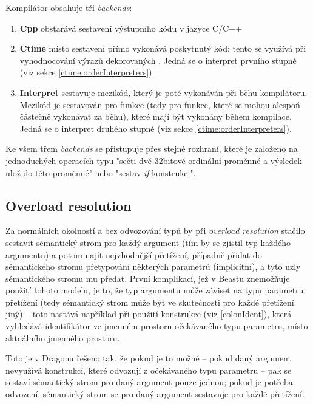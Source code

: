 Kompilátor obsahuje tři \textit{backends}:
\begin{enumerate}
	\item \textbf{Cpp} obstarává sestavení výstupního kódu v jazyce C/C++
	\item \textbf{Ctime} místo sestavení přímo vykonává poskytnutý kód; tento se využívá při vyhodnocování výrazů dekorovaných . Jedná se o interpret prvního stupně (viz sekce \ref{ctime:orderInterpreters}).
	\item \textbf{Interpret} sestavuje mezikód, který je poté vykonáván při běhu kompilátoru. Mezikód je sestavován pro \nonctime funkce (tedy pro funkce, které se mohou alespoň částečně vykonávat za běhu), které mají být vykonány během kompilace. Jedná se o interpret druhého stupně (viz sekce \ref{ctime:orderInterpreters}).
\end{enumerate}

Ke všem třem \textit{backends} se přistupuje přes stejné rozhraní, které je založeno na jednoduchých operacích typu "sečti dvě 32bitové ordinální proměnné a výsledek ulož do této proměnné" nebo "sestav \textit{if} konstrukci".


\subsection{Overload resolution} \label{sec:overloadResolution}
Za normálních okolností a bez odvozování typů by při \textit{overload resolution} stačilo sestavit sémantický strom pro každý argument (tím by se zjistil typ každého argumentu) a potom najít nejvhodnější přetížení, případně přidat do sémantického stromu přetypování některých parametrů (implicitní), a tyto uzly sémantického stromu mu předat. První komplikací, jež v Beastu znemožňuje použití tohoto modelu, je to, že typ argumentu může záviset na typu parametru přetížení (tedy sémantický strom může být ve skutečnosti pro každé přetížení jiný) -- toto nastává například při použití konstrukce  (viz \ref{colonIdent}), která vyhledává identifikátor  ve jmenném prostoru očekávaného typu parametru, místo aktuálního jmenného prostoru.

Toto je v Dragonu řešeno tak, že pokud je to možné -- pokud daný argument nevyužívá konstrukcí, které odvozují z očekávaného typu parametru -- pak se sestaví sémantický strom pro daný argument pouze jednou; pokud je potřeba odvození, sémantický strom se pro daný argument sestavuje pro každé přetížení.

